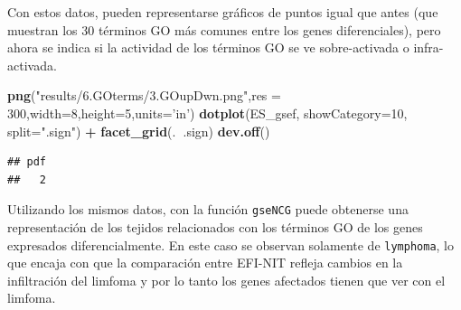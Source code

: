 \documentclass[
]{article}
\newenvironment{Shaded}{\begin{snugshade}}{\end{snugshade}}
\newcommand{\DataTypeTok}[1]{\textcolor[rgb]{0.13,0.29,0.53}{#1}}
\newcommand{\DecValTok}[1]{\textcolor[rgb]{0.00,0.00,0.81}{#1}}
\newcommand{\KeywordTok}[1]{\textcolor[rgb]{0.13,0.29,0.53}{\textbf{#1}}}
\newcommand{\NormalTok}[1]{#1}
\newcommand{\OperatorTok}[1]{\textcolor[rgb]{0.81,0.36,0.00}{\textbf{#1}}}
\newcommand{\StringTok}[1]{\textcolor[rgb]{0.31,0.60,0.02}{#1}}
\begin{document}
\begin{Shaded}
\end{Shaded}

Con estos datos, pueden representarse gráficos de puntos igual que antes
(que muestran los 30 términos GO más comunes entre los genes
diferenciales), pero ahora se indica si la actividad de los términos GO
se ve sobre-activada o infra-activada.

\begin{Shaded}
\begin{Highlighting}[]
\KeywordTok{png}\NormalTok{(}\StringTok{"results/6.GOterms/3.GOupDwn.png"}\NormalTok{,}\DataTypeTok{res =} \DecValTok{300}\NormalTok{,}\DataTypeTok{width=}\DecValTok{8}\NormalTok{,}\DataTypeTok{height=}\DecValTok{5}\NormalTok{,}\DataTypeTok{units=}\StringTok{'in'}\NormalTok{)}
\KeywordTok{dotplot}\NormalTok{(ES_gsef, }\DataTypeTok{showCategory=}\DecValTok{10}\NormalTok{, }\DataTypeTok{split=}\StringTok{".sign"}\NormalTok{) }\OperatorTok{+}\StringTok{ }\KeywordTok{facet_grid}\NormalTok{(.}\OperatorTok{~}\NormalTok{.sign)}
\KeywordTok{dev.off}\NormalTok{()}
\end{Highlighting}
\end{Shaded}

\begin{verbatim}
## pdf 
##   2
\end{verbatim}

Utilizando los mismos datos, con la función \texttt{gseNCG} puede
obtenerse una representación de los tejidos relacionados con los
términos GO de los genes expresados diferencialmente. En este caso se
observan solamente de \texttt{lymphoma}, lo que encaja con que la
comparación entre EFI-NIT refleja cambios en la infiltración del limfoma
y por lo tanto los genes afectados tienen que ver con el limfoma.
\end{document}
